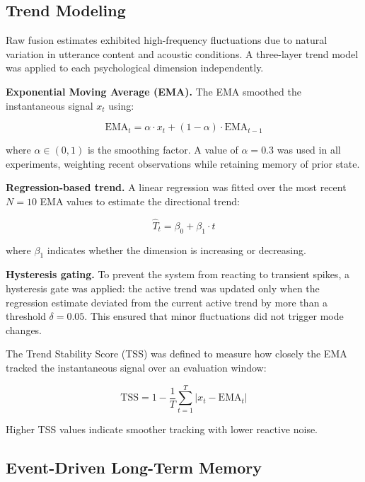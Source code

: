 \documentclass[conference]{IEEEtran}
\begin{document}
\subsection{Trend Modeling}

Raw fusion estimates exhibited high-frequency fluctuations due to natural variation in utterance content and acoustic conditions. A three-layer trend model was applied to each psychological dimension independently.

\textbf{Exponential Moving Average (EMA).} The EMA smoothed the instantaneous signal $x_t$ using:

\begin{equation}
\text{EMA}_t = \alpha \cdot x_t + (1 - \alpha) \cdot \text{EMA}_{t-1}
\label{eq:ema}
\end{equation}

where $\alpha \in (0,1)$ is the smoothing factor. A value of $\alpha = 0.3$ was used in all experiments, weighting recent observations while retaining memory of prior state.

\textbf{Regression-based trend.} A linear regression was fitted over the most recent $N = 10$ EMA values to estimate the directional trend:

\begin{equation}
\hat{T}_t = \beta_0 + \beta_1 \cdot t
\label{eq:regression}
\end{equation}

where $\beta_1$ indicates whether the dimension is increasing or decreasing.

\textbf{Hysteresis gating.} To prevent the system from reacting to transient spikes, a hysteresis gate was applied: the active trend was updated only when the regression estimate deviated from the current active trend by more than a threshold $\delta = 0.05$. This ensured that minor fluctuations did not trigger mode changes.

The Trend Stability Score (TSS) was defined to measure how closely the EMA tracked the instantaneous signal over an evaluation window:

\begin{equation}
\text{TSS} = 1 - \frac{1}{T} \sum_{t=1}^{T} |x_t - \text{EMA}_t|
\label{eq:tss}
\end{equation}

Higher TSS values indicate smoother tracking with lower reactive noise.

\subsection{Event-Driven Long-Term Memory}
\end{document}
